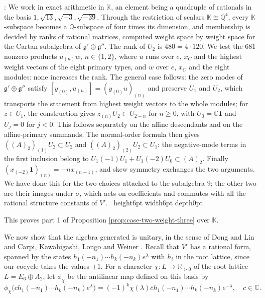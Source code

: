 \documentclass[leqno]{article}
\newcommand{\Cbb}{\ensuremath{\mathbb{C}}}
\newcommand{\K}{\ensuremath{\mathbb{K}}}
\newcommand{\R}{\ensuremath{\mathbb{R}}}
\renewcommand{\geq}{\ensuremath{\geqslant}}
\newcommand{\qed}{\hfill \vrule height6pt  width6pt depth0pt}
\newcommand{\co}{\colon}
\newenvironment{proof}[1][]{\noindent {\it Proof #1} : }{\hbox{~}\qed
\smallskip
}
\numberwithin{equation}{section}
\begin{document}
\begin{proof}
We work in exact arithmetic in $\K$, an element being a quadruple of rationals in the basis $1, \sqrt{13}, \sqrt{-3}, \sqrt{-39}$. Through the restriction of scalars $\K \cong \mathbb{Q}^4$, every $\K$-subspace becomes a $\mathbb{Q}$-subspace of four times its dimension, and membership is decided by ranks of rational matrices, computed weight space by weight space for the Cartan subalgebra of $\mathfrak g' \oplus \mathfrak g''$. The rank of $U_2$ is $480 = 4 \cdot 120$. We test the $681$ nonzero products $u_{(n)}w$, $n \in \{1,2\}$, where $u$ runs over $e$, $x_C$ and the highest weight vectors of the eight primary types, and $w$ over $e$, $x_C$ and the eight modules: none increases the rank. The general case follows: the zero modes of $\mathfrak g' \oplus \mathfrak g''$ satisfy $[y_{(0)}, u_{(n)}] = (y_{(0)}u)_{(n)}$ and preserve $U_1$ and $U_2$, which transports the statement from highest weight vectors to the whole modules; for $z \in U_1$, the construction gives $z_{(n)}U_2 \subset U_{2-n}$ for $n \geq 0$, with $U_0 = \Cbb\mathbf 1$ and $U_j = 0$ for $j < 0$. This follows separately on the affine descendants and on the affine-primary summands. The normal-order formula then gives $((A)_2)_{(1)}U_2 \subset U_2$ and $((A)_2)_{(2)}U_2 \subset U_1$: the negative-mode terms in the first inclusion belong to $U_1(-1)U_1 + U_1(-2)U_0 \subset (A)_2$. Finally $(x_{(-2)}\mathbf 1)_{(n)} = -n x_{(n-1)}$, and skew symmetry exchanges the two arguments. We have done this for the two choices attached to the subalgebra $9$; the other two are their images under $\sigma$, which acts on coefficients and commutes with all the rational structure constants of $V'$.
\end{proof}

This proves part 1 of Proposition \ref{prop:case-two-weight-three} over $\K$.

We now show that the algebra generated is unitary, in the sense of Dong and Lin \cite{DoL14} and Carpi, Kawahigashi, Longo and Weiner \cite[Section 5]{CKLW18}. Recall that $V'$ has a rational form, spanned by the states $h_1(-n_1)\cdots h_k(-n_k)e^\lambda$ with $h_i$ in the root lattice, since our cocycle takes the values $\pm 1$. For a character $\chi \co L \to \R_{>0}$ of the root lattice $L = E_6 \oplus A_2$, let $\phi_\chi$ be the antilinear map defined on this basis by
\begin{equation}
\label{eq:phi-chi}
\phi_\chi\big(c  h_1(-n_1)\cdots h_k(-n_k)e^\lambda\big) = (-1)^k  \chi(\lambda)  \overline{c}  h_1(-n_1)\cdots h_k(-n_k)e^{-\lambda}, \quad c \in \Cbb.
\end{equation}
\end{document}
